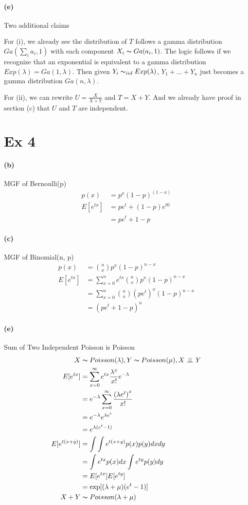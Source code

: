 \documentclass[11pt, letterpaper]{article}
\newcommand{\indep}{\perp \!\!\! \perp}
\begin{document}
\paragraph{(e)} Two additional claims

For (i), we already see the distribution of $T$ follows a gamma distribution $Ga(\sum_i a_i, 1)$ with each component $X_i \thicksim Ga(a_i, 1)$. The logic follows if we recognize that an exponential is equivalent to a gamma distribution $Exp(\lambda) = Ga(1, \lambda)$. Then given $Y_i \thicksim_{iid} Exp(\lambda)$, $Y_1 + ... + Y_n$ just becomes a gamma distribution $Ga(n, \lambda)$.

For (ii), we can rewrite $U = \frac{X}{X+Y}$ and $T = X + Y$. And we already have proof in section (c) that $U$ and $T$ are independent.

\section{Ex 4}
\paragraph{(b)} MGF of Bernoulli(p)
\begin{align*}
    p(x) &= p^x(1-p)^(1-x) \\
    E[e^{tx}] &= pe^t + (1-p)e^{t0} \\
        &= pe^t + 1 - p
\end{align*}
\paragraph{(c)} MGF of Binomial(n, p)
\begin{align*}
    p(x) &= {n \choose x} p^x (1-p)^{n-x} \\
    E[e^{tx}] &= \sum_{x=0}^n e^{tx} {n \choose x} p^x (1-p)^{n-x} \\
        &= \sum_{x=0}^n {n \choose x} (pe^t)^x (1-p)^{n-x} \\
        &= (pe^t + 1 - p)^n
\end{align*}
\paragraph{(e)} Sum of Two Independent Poisson is Poisson
\begin{align*}
    X &\thicksim Poisson(\lambda), Y \thicksim Poisson(\mu), X \indep Y \\
    E[e^{tx}] &= \sum_{x=0}^{\infty} e^{tx} \frac{\lambda^x}{x!} e^{-\lambda} \\
        &= e^{-\lambda} \sum_{x=0}^{\infty} \frac{{(\lambda e^t)}^x}{x!} \\
        &= e^{-\lambda} e^{\lambda e^t} \\
        &= e^{\lambda (e^t - 1)} \\
    E[e^{t(x+y)}] &= \int \int e^{t(x+y)} p(x) p(y) dx dy \\
        &= \int e^{tx} p(x) dx \int e^{ty} p(y) dy \\
        &= E[e^{tx}]E[e^{ty}] \\
        &= \exp[{(\lambda + \mu) (e^t - 1)}] \\
    X+Y &\thicksim Poisson(\lambda + \mu)
\end{align*}
\end{document}
